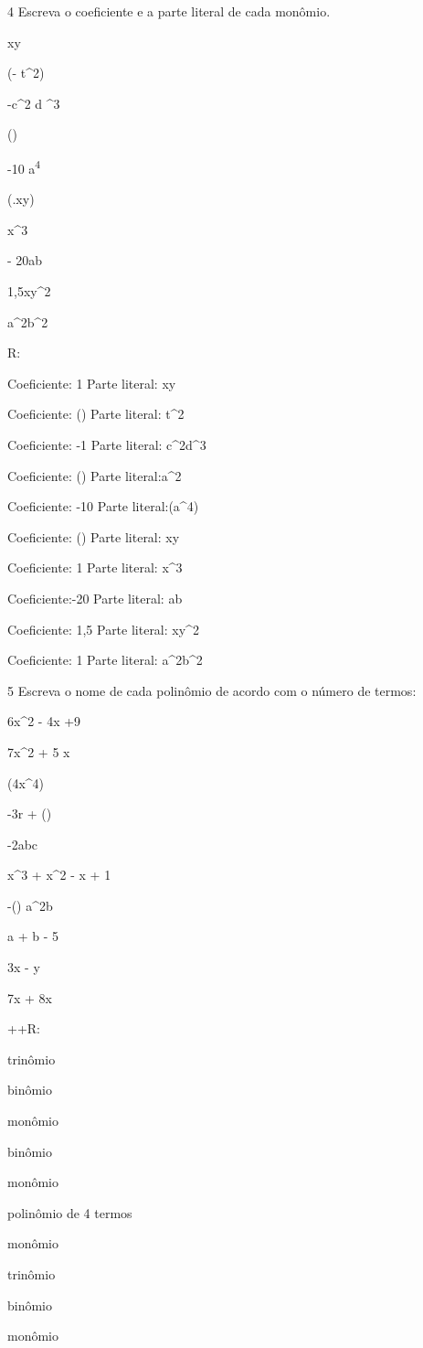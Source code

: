 {\num{4} Escreva o coeficiente e a parte literal de cada monômio.
\item xy
\item (- t^2)
\item -c^2 d ^3
\item ()
\item-10 a\textsuperscript{4}
\item (.{xy})
\item x^3
\item - 20ab
\item 1,5xy^2
\item a^2b^2

R:
\item
Coeficiente: 1
Parte literal: xy
\item Coeficiente: ()
Parte literal: t^2
\item Coeficiente: -1
Parte literal: c^2d^3
\item Coeficiente: ()
Parte literal:a^2
\item Coeficiente: -10
Parte literal:(a^4)
\item Coeficiente: ()
Parte literal: xy
\item Coeficiente: 1
Parte literal: x^3
\item Coeficiente:-20
Parte literal: ab
\item Coeficiente: 1,5
Parte literal: xy^2
\item Coeficiente: 1
Parte literal: a^2b^2

\num{5} Escreva o nome de cada polinômio de acordo com o número de termos:
\item 6x^2 - 4x +9
\item 7x^2 + 5 x
\item (4x^4)
\item -3r + ()
\item -2abc
\item x^3 + x^2 - x + 1
\item -() a^2b
\item a + b - 5
\item 3x - y
\item 7x + 8x

++R:
\item trinômio
\item binômio
\item monômio
\item binômio
\item monômio
\item polinômio de 4 termos
\item monômio
\item trinômio
\item binômio
\item monômio

}
